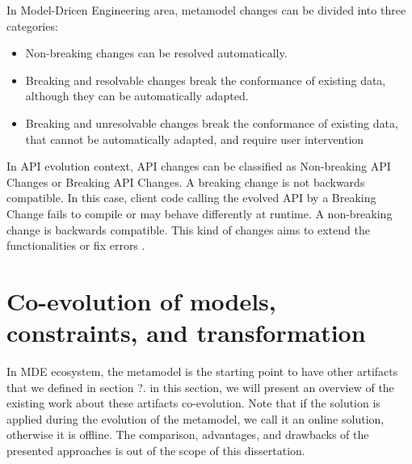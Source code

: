  In Model-Dricen Engineering area, metamodel changes can be divided into three categories\cite{gruschko2007towards}:
 \begin{itemize}
 	
 \item	Non-breaking changes can be resolved automatically.
  \item Breaking and resolvable changes break the conformance of existing data, although they can be automatically adapted.
 \item Breaking and unresolvable changes break the conformance of existing data, that cannot be automatically adapted, and require user intervention
 \end{itemize}
 	In API evolution context, API changes can be classified as Non-breaking API Changes	or Breaking API Changes. A breaking change is not backwards compatible. In this case, client code calling the evolved API by a Breaking Change fails to compile or may behave differently at runtime. A non-breaking change is backwards compatible. This kind of changes aims to extend the functionalities or fix errors \cite{dig2006apis}.
 \section{Co-evolution of models, constraints, and transformation}
 \label{coevolutionartifacts}
 In MDE ecosystem, the metamodel is the starting point to have other artifacts that we defined in section ?. in this section, we will present an overview of the existing work about these artifacts co-evolution. Note that if the solution is applied during the evolution of the metamodel, we call it an online solution, otherwise it is offline.
 The comparison, advantages, and drawbacks of the presented approaches is out of the scope of this dissertation.
 
